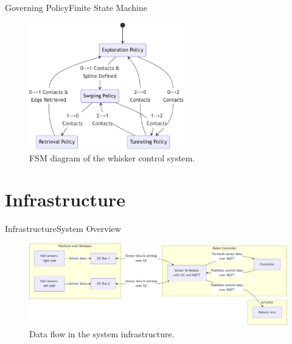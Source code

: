 \documentclass[AIRbeamer
,optEnglish
,optBiber
,optBibstyleAlphabetic
,optBeamerClassicFormat%
]{AIRlatex}
\begin{document}
    \begin{frame}{Governing Policy}{Finite State Machine}
        \begin{figure}[H]
            \centering
            \includegraphics[width=0.6\textwidth]{figures/diagrams/fsm}
            \caption{FSM diagram of the whisker control system.}
        \end{figure}
    \end{frame}


    \section{Infrastructure}
    \begin{frame}{Infrastructure}{System Overview}
        \begin{figure}[H]
            \centering
            \includegraphics[width=\textwidth]{figures/diagrams/infrastructure-overview}
            \caption{Data flow in the system infrastructure.}
        \end{figure}
    \end{frame}
\end{document}
